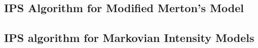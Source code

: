 \subsection{IPS Algorithm for Modified Merton's Model}

\subsection{IPS algorithm for Markovian Intensity Models}

